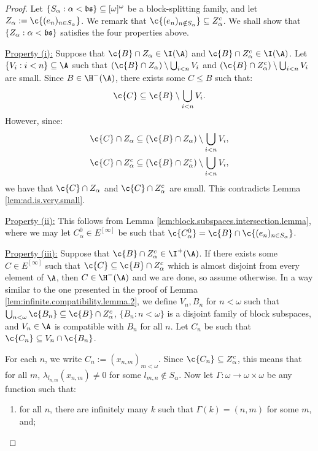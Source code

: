 \documentclass[11pt,reqno]{amsart}
\begin{document}
\begin{proof}
    Let $\{S_\alpha : \alpha < \frak{bs}\} \subseteq [\omega]^\omega$ be a block-splitting family, and let $Z_\alpha := \c{(e_n)_{n \in S_\alpha}}$. We remark that $\c{(e_n)_{n \notin S_\alpha}} \subseteq Z_\alpha^c$. We shall show that $\{Z_\alpha : \alpha < \frak{bs}\}$ satisfies the four properties above. 

    \underline{Property (i):} Suppose that $\c{B} \cap Z_\alpha \in \I(\A)$ and $\c{B} \cap Z_\alpha^c \in \I(\A)$. Let $\{V_i : i < n\} \subseteq \A$ such that $(\c{B} \cap Z_\alpha) \setminus \bigcup_{i<n} V_i$ and $(\c{B} \cap Z_\alpha^c) \setminus \bigcup_{i<n} V_i$ are small. Since $B \in \H^-(\A)$, there exists some $C \leq B$ such that:
    \begin{align*}
        \c{C} \subseteq \c{B} \setminus \bigcup_{i<n} V_i.
    \end{align*}
    However, since:
    \begin{align*}
        \c{C} \cap Z_\alpha \subseteq (\c{B} \cap Z_\alpha) \setminus \bigcup_{i<n} V_i, \\        
        \c{C} \cap Z_\alpha^c \subseteq (\c{B} \cap Z_\alpha^c) \setminus \bigcup_{i<n} V_i,
    \end{align*}
    we have that $\c{C} \cap Z_\alpha$ and $\c{C} \cap Z_\alpha^c$ are small. This contradicts Lemma \ref{lem:ad.is.very.small}.

    \underline{Property (ii):} This follows from Lemma \ref{lem:block.subspaces.intersection.lemma}, where we may let $C_\alpha^0 \in E^{[\infty]}$ be such that $\c{C_\alpha^0} = \c{B} \cap \c{(e_n)_{n \in S_\alpha}}$.
    
    \underline{Property (iii):} Suppose that $\c{B} \cap Z_\alpha^c \in \I^+(\A)$. If there exists some $C \in E^{[\infty]}$ such that $\c{C} \subseteq \c{B} \cap Z_\alpha^c$ which is almost disjoint from every element of $\A$, then $C \in \H^-(\A)$ and we are done, so assume otherwise. In a way similar to the one presented in the proof of Lemma \ref{lem:infinite.compatibility.lemma.2}, we define $V_n,B_n$ for $n < \omega$ such that $\bigcup_{n<\omega} \c{B_n} \subseteq \c{B} \cap Z_\alpha^c$, $\{B_n : n < \omega\}$ is a disjoint family of block subspaces, and $V_n \in \A$ is compatible with $B_n$ for all $n$. Let $C_n$ be such that $\c{C_n} \subseteq V_n \cap \c{B_n}$. 
    
    For each $n$, we write $C_n := (x_{n,m})_{m<\omega}$. Since $\c{C_n} \subseteq Z_\alpha^c$, this means that for all $m$, $\lambda_{l_{n,m}}(x_{n,m}) \neq 0$ for some $l_{m,n} \notin S_\alpha$. Now let $\Gamma : \omega \to \omega \times \omega$ be any function such that:
    \begin{enumerate}
        \item for all $n$, there are infinitely many $k$ such that $\Gamma(k) = (n,m)$ for some $m$, and;


\end{enumerate}
\end{proof}
\end{document}
